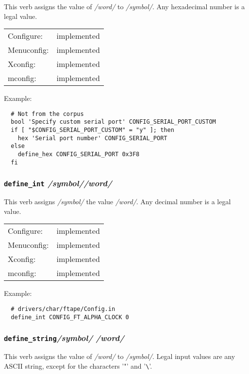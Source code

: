 This verb assigns the value of \textit{/word/} to \textit{/symbol/}.  Any hexadecimal
number is a legal value.

\begin{tabular}{ll}
Configure:  &implemented\\
Menuconfig: &implemented\\
Xconfig:    &implemented\\
mconfig:    &implemented\\
\end{tabular}

Example:
{\small\begin{verbatim}
  # Not from the corpus
  bool 'Specify custom serial port' CONFIG_SERIAL_PORT_CUSTOM
  if [ "$CONFIG_SERIAL_PORT_CUSTOM" = "y" ]; then
    hex 'Serial port number' CONFIG_SERIAL_PORT
  else
    define_hex CONFIG_SERIAL_PORT 0x3F8
  fi
\end{verbatim}}



\subsubsection{\texttt{define\_int} \quad\textit{/symbol/}\quad \textit{/word/}}

This verb assigns \textit{/symbol/} the value \textit{/word/}.  
Any decimal number is a legal value.

\begin{tabular}{ll}
Configure:  &implemented\\
Menuconfig: &implemented\\
Xconfig:    &implemented\\
mconfig:    &implemented\\
\end{tabular}

Example:
{\small\begin{verbatim}
  # drivers/char/ftape/Config.in
  define_int CONFIG_FT_ALPHA_CLOCK 0
\end{verbatim}}



\subsubsection{\texttt{define\_string}\quad \textit{/symbol/} \quad\textit{/word/}}

This verb assigns the value of \textit{/word/} to \textit{/symbol/}. 
Legal input values are any ASCII string, except for the characters '"' 
and '\verb"\"'.

